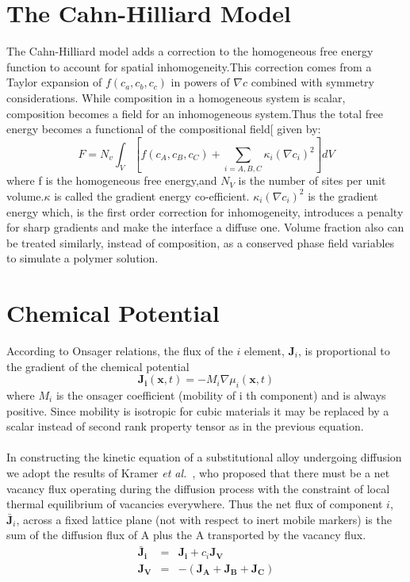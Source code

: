 \documentclass[12pt]{iiscthes}
\theoremstyle{definition}
\theoremstyle{definition}
\theoremstyle{remark}
\begin{document}
\section{The Cahn-Hilliard Model}
The Cahn-Hilliard model adds a correction to the homogeneous free energy function to account for spatial inhomogeneity.This correction comes from a Taylor expansion of $ f\left(c_a,c_b,c_c\right) $ in powers of $ \nabla c $ combined with symmetry considerations. While composition in a homogeneous system is scalar, composition becomes a field for an inhomogeneous system.Thus the total free energy becomes a functional of the compositional field[\cite{Cahn} given by:
\begin{equation}\label{che} F=N_v\int_{V}\left[f\left(c_A,c_B,c_C\right)+\sum_{i=A,B,C}\kappa_i\left(\nabla c_i\right)^2\right]dV \end{equation}
where f is the homogeneous free energy,and $N_V$ is the number of sites per unit volume.$\kappa$ is called the gradient energy co-efficient. $\kappa_i\left(\nabla c_i\right)^2$ is the gradient energy which, is the first order correction for inhomogeneity, introduces a penalty for sharp gradients and make the interface a diffuse one. Volume fraction also can be treated similarly, instead of composition, as a conserved phase field variables to simulate a polymer solution.
\section{Chemical Potential}
According to Onsager relations, the flux of the $i$ element, $ \mathbf{J}_i $, is proportional to the gradient of the chemical potential
\begin{equation}\label{53}
\mathbf{J_i}\left(\mathbf{x},t\right)= -M_i\nabla \mu_i\left(\mathbf{x},t\right) 
\end{equation}
 where $ M_i $ is the onsager coefficient (mobility of i th component)  and is always positive. Since mobility is isotropic for cubic materials it may be replaced by a scalar instead of second rank property tensor as in the previous equation.\\
 \\
In constructing the kinetic equation of a substitutional alloy undergoing diffusion we adopt the results of Kramer \emph{et al.}~\cite{kramer}, who proposed that there must be a net vacancy flux operating during the diffusion process with the constraint of local thermal equilibrium of vacancies everywhere. Thus the net flux of component $i$, $\mathbf{\bar J}_i $, across a fixed lattice plane (not with respect to inert mobile markers) is the sum of the diffusion flux of A plus the A transported by the vacancy flux.
\begin{eqnarray}\label{v}
\mathbf{\bar J_i} &=& \mathbf{J_i} + c_i \mathbf{J_V}\nonumber\\
\mathbf{J_V} &=& -(\mathbf{J_A} + \mathbf{J_B} + \mathbf{J_C})
\end{eqnarray}
\end{document}
